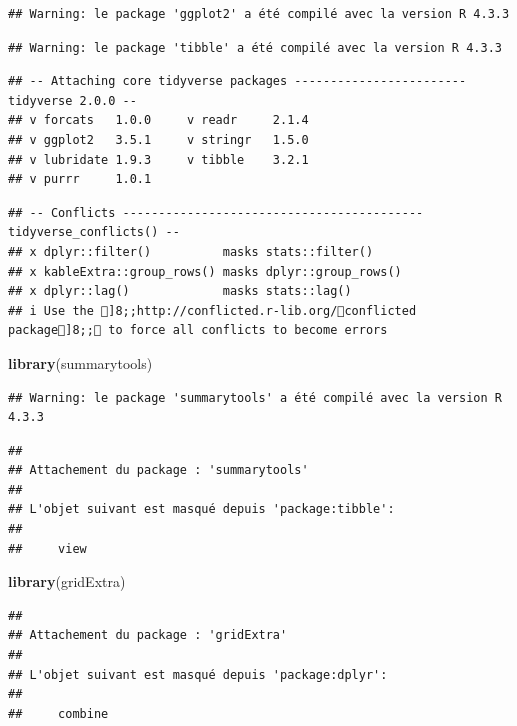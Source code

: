\documentclass[
]{article}
\newenvironment{Shaded}{\begin{snugshade}}{\end{snugshade}}
\newcommand{\FunctionTok}[1]{\textcolor[rgb]{0.13,0.29,0.53}{\textbf{#1}}}
\newcommand{\NormalTok}[1]{#1}
\begin{document}
\begin{verbatim}
## Warning: le package 'ggplot2' a été compilé avec la version R 4.3.3
\end{verbatim}

\begin{verbatim}
## Warning: le package 'tibble' a été compilé avec la version R 4.3.3
\end{verbatim}

\begin{verbatim}
## -- Attaching core tidyverse packages ------------------------ tidyverse 2.0.0 --
## v forcats   1.0.0     v readr     2.1.4
## v ggplot2   3.5.1     v stringr   1.5.0
## v lubridate 1.9.3     v tibble    3.2.1
## v purrr     1.0.1
\end{verbatim}

\begin{verbatim}
## -- Conflicts ------------------------------------------ tidyverse_conflicts() --
## x dplyr::filter()          masks stats::filter()
## x kableExtra::group_rows() masks dplyr::group_rows()
## x dplyr::lag()             masks stats::lag()
## i Use the ]8;;http://conflicted.r-lib.org/conflicted package]8;; to force all conflicts to become errors
\end{verbatim}

\begin{Shaded}
\begin{Highlighting}[]
\FunctionTok{library}\NormalTok{(summarytools)}
\end{Highlighting}
\end{Shaded}

\begin{verbatim}
## Warning: le package 'summarytools' a été compilé avec la version R 4.3.3
\end{verbatim}

\begin{verbatim}
## 
## Attachement du package : 'summarytools'
## 
## L'objet suivant est masqué depuis 'package:tibble':
## 
##     view
\end{verbatim}

\begin{Shaded}
\begin{Highlighting}[]
\FunctionTok{library}\NormalTok{(gridExtra)}
\end{Highlighting}
\end{Shaded}

\begin{verbatim}
## 
## Attachement du package : 'gridExtra'
## 
## L'objet suivant est masqué depuis 'package:dplyr':
## 
##     combine
\end{verbatim}
\end{document}
